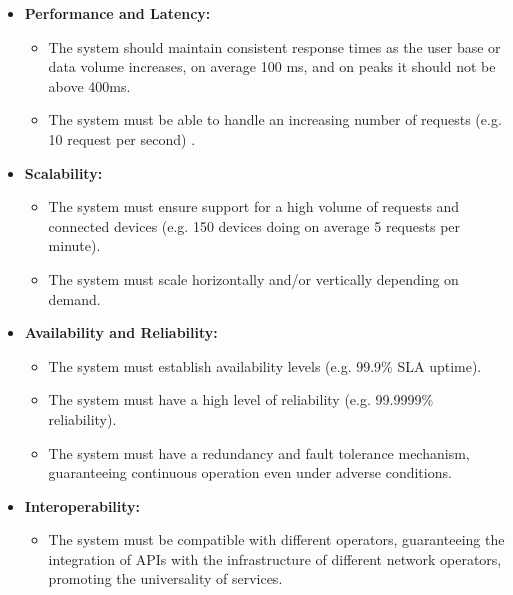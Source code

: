 \begin{itemize}
	\item \textbf{Performance and Latency:}
	      \begin{itemize}
		      \item The system should maintain consistent response times as the
		            user base or data volume increases, on average 100 ms, and on
		            peaks it should not be above 400ms.

		      \item The system must be able to handle an increasing number of
		            requests (e.g. 10 request per second) .
	      \end{itemize}

	\item \textbf{Scalability:}
	      \begin{itemize}
		      \item The system must ensure support for a high volume of requests
		            and connected devices (e.g. 150 devices doing on average 5 requests
		            per minute).

		      \item The system must scale horizontally and/or vertically depending on demand.
	      \end{itemize}

	\item \textbf{Availability and Reliability:}
	      \begin{itemize}
		      \item The system must establish availability levels (e.g. 99.9\% SLA
		            uptime).

		      \item The system must have a high level of reliability (e.g. 99.9999\%
		            reliability).

		      \item The system must have a redundancy and fault tolerance mechanism,
		            guaranteeing continuous operation even under adverse conditions.
	      \end{itemize}

	\item  \textbf{Interoperability:}
	      \begin{itemize}
		      \item The system must be compatible with different operators,
		            guaranteeing the integration of APIs with the infrastructure of
		            different network operators, promoting the universality of services.


\end{itemize}
\end{itemize}
